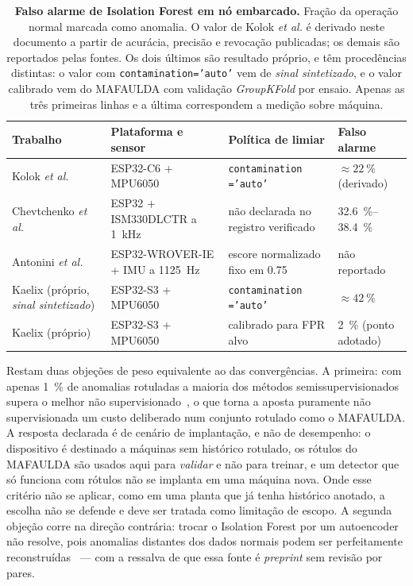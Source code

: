 \documentclass[11pt,a4paper]{article}
\begin{document}
\begin{table}[!htb]
\centering
\caption{\textbf{Falso alarme de Isolation Forest em nó embarcado.} Fração da operação
normal marcada como anomalia. O valor de Kolok \emph{et al.} é derivado neste documento
a partir de acurácia, precisão e revocação publicadas; os demais são reportados pelas
fontes. Os dois últimos são resultado próprio, e têm procedências distintas: o valor com
\texttt{contamination='auto'} vem de \emph{sinal sintetizado}, e o valor calibrado vem do
MAFAULDA com validação \emph{GroupKFold} por ensaio. Apenas as três primeiras linhas e a
última correspondem a medição sobre máquina.}
\label{tab:fpr}
\footnotesize
\setlength{\tabcolsep}{4pt}
\begin{tabular}{@{}p{3.1cm}p{4.0cm}p{4.1cm}p{3.1cm}@{}}
\toprule
\textbf{Trabalho} & \textbf{Plataforma e sensor} & \textbf{Política de limiar} & \textbf{Falso alarme} \\
\midrule
Kolok \emph{et al.}~\cite{kolok2025}
  & ESP32-C6 + MPU6050
  & \texttt{contamination} \texttt{='auto'}
  & $\approx\SI{22}{\percent}$ (derivado) \\
Chevtchenko \emph{et al.}~\cite{chevtchenko2023}
  & ESP32 + ISM330DLCTR a \SI{1}{\kilo\hertz}
  & não declarada no registro verificado
  & \SIrange{32,6}{38,4}{\percent} \\
Antonini \emph{et al.}~\cite{antonini2023}
  & ESP32-WROVER-IE + IMU a \SI{1125}{\hertz}
  & escore normalizado fixo em \num{0,75}
  & não reportado \\
Kaelix (próprio, \emph{sinal sintetizado})
  & ESP32-S3 + MPU6050
  & \texttt{contamination} \texttt{='auto'}
  & $\approx\SI{42}{\percent}$ \\
Kaelix (próprio)
  & ESP32-S3 + MPU6050
  & calibrado para FPR alvo
  & \SI{2}{\percent} (ponto adotado) \\
\bottomrule
\end{tabular}
\end{table}

Restam duas objeções de peso equivalente ao das convergências. A primeira: com apenas
\SI{1}{\percent} de anomalias rotuladas a maioria dos métodos semissupervisionados supera
o melhor não supervisionado~\cite{han2022}, o que torna a aposta puramente não
supervisionada um custo deliberado num conjunto rotulado como o MAFAULDA. A resposta
declarada é de cenário de implantação, e não de desempenho: o dispositivo é destinado a
máquinas sem histórico rotulado, os rótulos do MAFAULDA são usados aqui para
\emph{validar} e não para treinar, e um detector que só funciona com rótulos não se
implanta em uma máquina nova. Onde esse critério não se aplicar, como em uma planta que já
tenha histórico anotado, a escolha não se defende e deve ser tratada como limitação de
escopo. A segunda objeção corre na direção contrária: trocar o Isolation Forest por um
autoencoder não resolve, pois anomalias distantes dos dados normais podem ser
perfeitamente reconstruídas~\cite{bouman2025} --- com a ressalva de que essa fonte é
\emph{preprint} sem revisão por pares.
\end{document}
